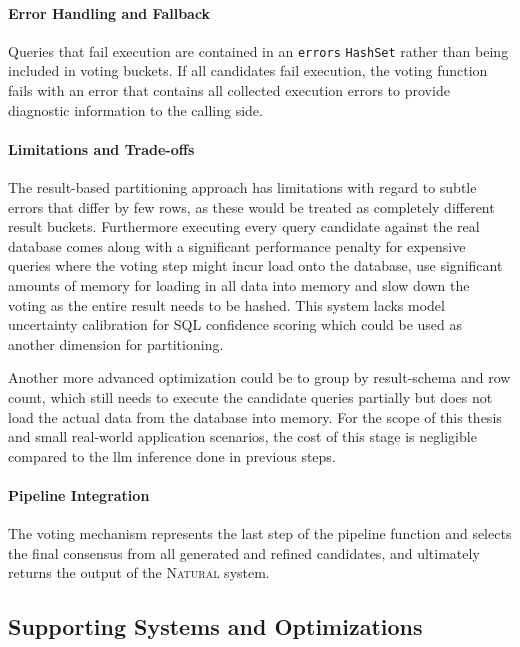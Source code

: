 \paragraph{Error Handling and Fallback}

Queries that fail execution are contained in an \texttt{errors}
\texttt{HashSet} rather than being included in voting buckets. If all
candidates fail execution, the voting function fails with an error that
contains all collected execution errors to provide diagnostic information to
the calling side.

\paragraph{Limitations and Trade-offs}

The result-based partitioning approach has limitations with regard to subtle
errors that differ by few rows, as these would be treated as completely
different result buckets. Furthermore executing every query candidate against
the real database comes along with a significant performance penalty for
expensive queries where the voting step might incur load onto the database, use
significant amounts of memory for loading in all data into memory and slow down
the voting as the entire result needs to be hashed. This system lacks model
uncertainty calibration for SQL confidence scoring which could be used as
another dimension for partitioning.

Another more advanced optimization could be to group by result-schema and row
count, which still needs to execute the candidate queries partially but does
not load the actual data from the database into memory. For the scope of this
thesis and small real-world application scenarios, the cost of this stage is
negligible compared to the llm inference done in previous steps. 

\paragraph{Pipeline Integration}

The voting mechanism represents the last step of the pipeline function 
and selects the final consensus from all generated and refined candidates, 
and ultimately returns the output of the \textsc{Natural} system.

\subsection{Supporting Systems and Optimizations}

